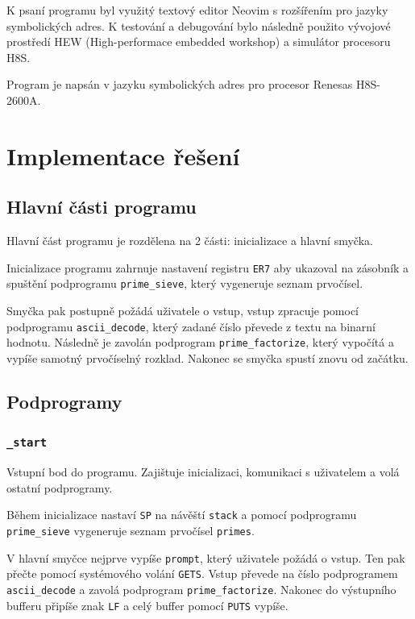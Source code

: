 \documentclass[12pt]{article}
\newcommand{\code}[1]{\mbox{\texttt{#1}}}
\begin{document}
K psaní programu byl využitý textový editor Neovim s rozšířením pro jazyky
symbolických adres. K testování a debugování bylo následně použito vývojové
prostředí HEW (High-performace embedded workshop) a simulátor procesoru H8S.

Program je napsán v jazyku symbolických adres pro procesor Renesas H8S-2600A.

\section{Implementace řešení}

\subsection{Hlavní části programu}

Hlavní část programu je rozdělena na 2 části: inicializace a hlavní smyčka.

Inicializace programu zahrnuje nastavení registru \code{ER7} aby ukazoval na
zásobník a spuštění podprogramu \code{prime\_sieve}, který vygeneruje seznam
prvočísel.

Smyčka pak postupně požádá uživatele o vstup, vstup zpracuje pomocí
podprogramu \code{ascii\_decode}, který zadané číslo převede z textu na binarní
hodnotu. Následně je zavolán podprogram \code{prime\_factorize}, který vypočítá
a vypíše samotný prvočíselný rozklad. Nakonec se smyčka spustí znovu od
začátku.

\subsection{Podprogramy}

\subsubsection{\code{\_start}}

Vstupní bod do programu. Zajištuje inicializaci, komunikaci s uživatelem a volá
ostatní podprogramy.

Během inicializace nastaví \code{SP} na návěští \code{stack} a pomocí
podprogramu \code{prime\_sieve} vygeneruje seznam prvočísel \code{primes}.

V hlavní smyčce nejprve vypíše \code{prompt}, který uživatele požádá o vstup.
Ten pak přečte pomocí systémového volání \code{GETS}. Vstup převede na číslo
podprogramem \code{ascii\_decode} a zavolá podprogram \code{prime\_factorize}.
Nakonec do výstupního bufferu připíše znak \code{LF} a celý buffer pomocí
\code{PUTS} vypíše.
\end{document}
